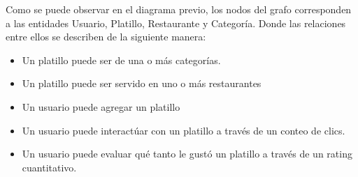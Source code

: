       Como se puede observar en el diagrama previo, los nodos del grafo corresponden a las entidades Usuario, Platillo, Restaurante y Categoría. Donde las relaciones entre ellos se describen de la siguiente manera: 
      \begin{itemize}
        \item Un platillo puede ser de una o más categorías.
        \item Un platillo puede ser servido en uno o más restaurantes
        \item Un usuario puede agregar un platillo
        \item Un usuario puede interactúar con un platillo a través de un conteo de clics.
        \item Un usuario puede evaluar qué tanto le gustó un platillo a través de un rating cuantitativo.
      \end{itemize} 

